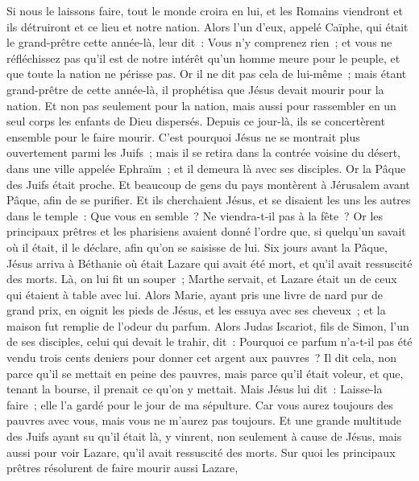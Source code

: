 \begin{multicols}{2}
Si nous le laissons faire, tout le monde croira en lui, et les Romains viendront et ils détruiront et ce lieu et notre nation.
Alors l'un d'eux, appelé Caïphe, qui était le grand-prêtre cette année-là, leur dit~: Vous n'y comprenez rien~;
et vous ne réfléchissez pas qu'il est de notre intérêt qu'un homme meure pour le peuple, et que toute la nation ne périsse pas.
Or il ne dit pas cela de lui-même~; mais étant grand-prêtre de cette année-là, il prophétisa que Jésus devait mourir pour la nation.
Et non pas seulement pour la nation, mais aussi pour rassembler en un seul corps les enfants de Dieu dispersés.
Depuis ce jour-là, ils se concertèrent ensemble pour le faire mourir.
C'est pourquoi Jésus ne se montrait plus ouvertement parmi les Juifs~; mais il se retira dans la contrée voisine du désert, dans une ville appelée Ephraïm~; et il demeura là avec ses disciples.
Or la Pâque des Juifs était proche. Et beaucoup de gens du pays montèrent à Jérusalem avant Pâque, afin de se purifier.
Et ils cherchaient Jésus, et se disaient les uns les autres dans le temple~: Que vous en semble~? Ne viendra-t-il pas à la fête~?
Or les principaux prêtres et les pharisiens avaient donné l'ordre que, si quelqu'un savait où il était, il le déclare, afin qu'on se saisisse de lui.
\VerseOne{}Six jours avant la Pâque, Jésus arriva à Béthanie où était Lazare qui avait été mort, et qu'il avait ressuscité des morts.
Là, on lui fit un souper~; Marthe servait, et Lazare était un de ceux qui étaient à table avec lui.
Alors Marie, ayant pris une livre de nard pur de grand prix, en oignit les pieds de Jésus, et les essuya avec ses cheveux~; et la maison fut remplie de l'odeur du parfum.
Alors Judas Iscariot, fils de Simon, l'un de ses disciples, celui qui devait le trahir, dit~:
Pourquoi ce parfum n'a-t-il pas été vendu trois cents deniers pour donner cet argent aux pauvres~?
Il dit cela, non parce qu'il se mettait en peine des pauvres, mais parce qu'il était voleur, et que, tenant la bourse, il prenait ce qu'on y mettait.
Mais Jésus lui dit~: Laisse-la faire~; elle l'a gardé pour le jour de ma sépulture.
Car vous aurez toujours des pauvres avec vous, mais vous ne m'aurez pas toujours.
Et une grande multitude des Juifs ayant su qu'il était là, y vinrent, non seulement à cause de Jésus, mais aussi pour voir Lazare, qu'il avait ressuscité des morts.
Sur quoi les principaux prêtres résolurent de faire mourir aussi Lazare,

\end{multicols}
